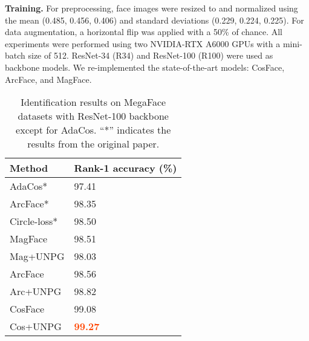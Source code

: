 \documentclass[10pt,twocolumn]{article}
\begin{document}
\noindent\textbf{Training.} For preprocessing, face images were resized to  and normalized using the mean (0.485, 0.456, 0.406) and standard deviations (0.229, 0.224, 0.225). For data augmentation, a horizontal flip was applied with a 50\% of chance. All experiments were performed using two NVIDIA-RTX A6000 GPUs with a mini-batch size of 512. ResNet-34 (R34) and ResNet-100 (R100) were used as backbone models. We re-implemented the state-of-the-art models: CosFace\cite{wang2018cosface}, ArcFace\cite{deng2019arcface}, and MagFace\cite{meng2021magface}. 

\begin{table}[!tb]
    \caption{Identification results on MegaFace datasets with ResNet-100 backbone except for AdaCos. “*” indicates the results from the original paper.}
    \label{tab:megaface}
      \centering
      \begin{center}
        {\small
        \begin{tabular}[]{C{3cm} C{4cm}}
         \hline
         \textbf{Method} & \textbf{Rank-1 accuracy (\%)} \\
         \hline
         AdaCos*\cite{zhang2019adacos} & 97.41  \\
         ArcFace*  & 98.35  \\
         Circle-loss*  & 98.50  \\
         \hline
         MagFace & 98.51 \\
         Mag+UNPG & 98.03 \\
ArcFace & 98.56 \\
         Arc+UNPG & 98.82 \\
CosFace & 99.08 \\
         Cos+UNPG & \textbf{\textcolor{OrangeRed}{99.27}} \\
         \hline
        \end{tabular}
        }
      \end{center}
\end{table}
\end{document}
